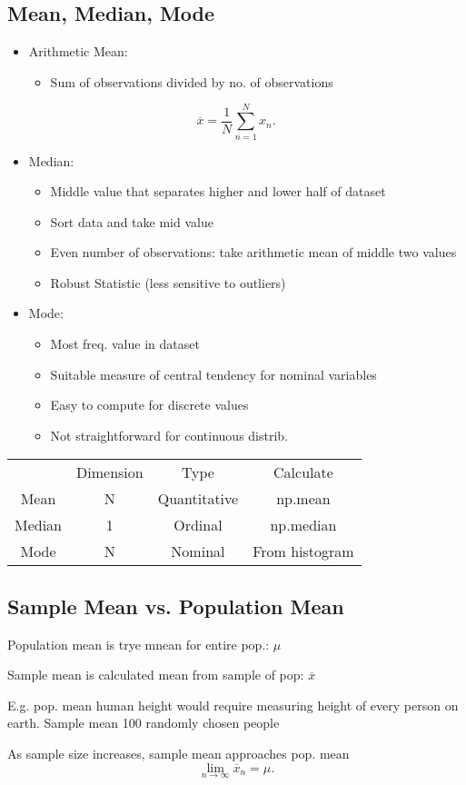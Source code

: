 \documentclass[a4paper]{article}
\begin{document}
 \subsection{Mean, Median, Mode}
 \begin{itemize}
 	\item Arithmetic Mean:
	\begin{itemize}
		\item Sum of observations divided by no. of observations
	\end{itemize}
 \end{itemize}
 \[
 \overline{x} = \frac{1}{N}\sum_{n=1}^{N} x_n
 .\]
 \begin{itemize}
 	\item Median:
	\begin{itemize}
		\item Middle value that separates higher and lower half of
			dataset
		\item Sort data and take mid value
		\item Even number of observations: take arithmetic mean of
			middle two values
		\item Robust Statistic (less sensitive to outliers)
	\end{itemize}
	\item Mode:
	\begin{itemize}
		\item Most freq. value in dataset
		\item Suitable measure of central tendency for nominal variables
		\item Easy to compute for discrete values
		\item Not straightforward for continuous distrib.
	\end{itemize}
 \end{itemize}
\begin{table}[htpb]
	\centering
	\begin{tabular}{c c c c}
		& Dimension & Type & Calculate \\
		Mean & N & Quantitative & np.mean \\
		Median & 1 & Ordinal & np.median \\
		Mode & N & Nominal & From histogram
	\end{tabular}
\end{table}
\subsection{Sample Mean vs. Population Mean}
Population mean is trye mnean for entire pop.: $\mu$
\par Sample mean is calculated mean from sample of pop: $\overline{x}$
\par E.g. pop. mean human height would require measuring height of every person
on earth. Sample mean 100 randomly chosen people
\par As sample size increases, sample mean approaches pop. mean
\[
\lim_{n \to \infty} \overline{x}_n = \mu
.\]
\end{document}
